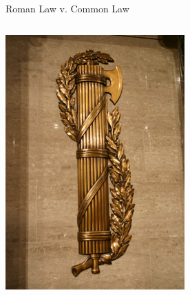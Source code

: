 \begin{frame}{Roman Law v. Common Law}
    \begin{columns}[onlytextwidth]
            \centering
            \includegraphics[height=0.75\textheight]{img/fasces.png} \\


\end{columns}
\end{frame}
